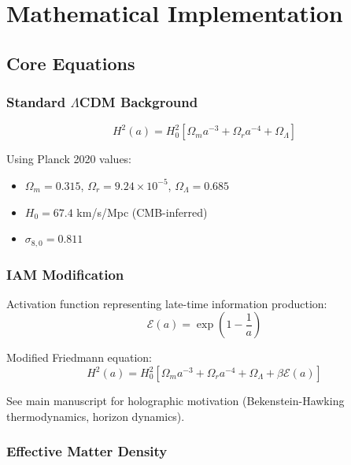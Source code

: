\documentclass[11pt]{article}
\begin{document}
\section{Mathematical Implementation}

\subsection{Core Equations}

\subsubsection{Standard $\Lambda$CDM Background}

\begin{equation}
H^2(a) = H_0^2 \left[ \Omega_m a^{-3} + \Omega_r a^{-4} + \Omega_\Lambda \right]
\end{equation}

\noindent Using Planck 2020 values:
\begin{itemize}
    \item $\Omega_m = 0.315$, $\Omega_r = 9.24 \times 10^{-5}$, $\Omega_\Lambda = 0.685$
    \item $H_0 = 67.4$ km/s/Mpc (CMB-inferred)
    \item $\sigma_{8,0} = 0.811$
\end{itemize}

\subsubsection{IAM Modification}

Activation function representing late-time information production:
\begin{equation}
\mathcal{E}(a) = \exp\left(1 - \frac{1}{a}\right)
\end{equation}

Modified Friedmann equation:
\begin{equation}
H^2(a) = H_0^2\left[\Omega_m a^{-3} + \Omega_r a^{-4} + \Omega_\Lambda + \beta \mathcal{E}(a)\right]
\end{equation}

\noindent See main manuscript for holographic motivation (Bekenstein-Hawking thermodynamics, horizon dynamics).

\subsubsection{Effective Matter Density}
\end{document}
